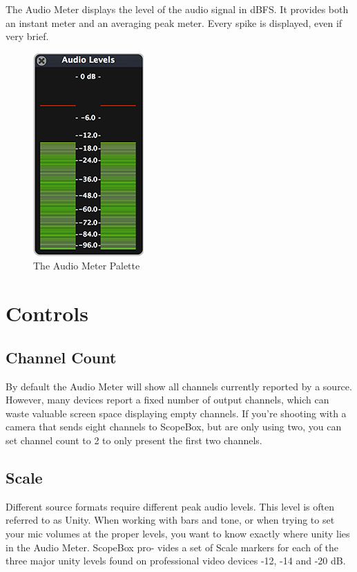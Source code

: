 \documentclass[10,letterpaper,]{report}
\begin{document}
The Audio Meter displays the level of the audio signal in dBFS. It
provides both an instant meter and an averaging peak meter. Every spike
is displayed, even if very brief.

\begin{figure}[htbp]
\centering
\includegraphics{images/AudioLevels.png}
\caption{The Audio Meter Palette}
\end{figure}

\section{Controls}

\subsection{Channel Count}

By default the Audio Meter will show all channels currently reported by
a source. However, many devices report a fixed number of output
channels, which can waste valuable screen space displaying empty
channels. If you're shooting with a camera that sends eight channels to
ScopeBox, but are only using two, you can set channel count to 2 to only
present the first two channels.

\subsection{Scale}

Different source formats require different peak audio levels. This level
is often referred to as Unity. When working with bars and tone, or when
trying to set your mic volumes at the proper levels, you want to know
exactly where unity lies in the Audio Meter. ScopeBox pro- vides a set
of Scale markers for each of the three major unity levels found on
professional video devices -12, -14 and -20 dB.
\end{document}
